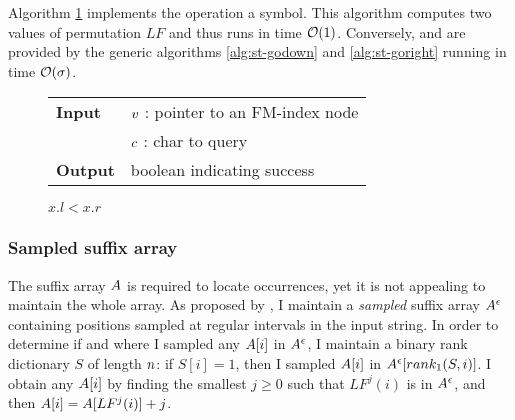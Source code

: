 Algorithm \ref{alg:fm-godownc} implements the operation  a symbol.
This algorithm computes two values of permutation $LF$ and thus runs in time $\mathcal{O}(1)$.
Conversely,  and  are provided by the generic algorithms \ref{alg:st-godown} and \ref{alg:st-goright} running in time $\mathcal{O}(\sigma)$.


\begin{figure*}
\begin{center}
\begin{minipage}[t]{.5\textwidth}
\begin{algorithm}[H]
\begin{tabular}{ll}
\textbf{Input}  & $v$ : pointer to an FM-index node\\
				& $c$ : char to query\\
\textbf{Output} & boolean indicating success\\
\end{tabular}
\begin{algorithmic}[1]
	\State \Return \False
\EndIf
{}
\State \Return $x.l < x.r$
\end{algorithmic}
\label{alg:fm-godownc}
\end{algorithm}
\end{minipage}
\end{center}
\end{figure*}

\subsubsection{Sampled suffix array}

The suffix array $A$ is required to locate occurrences, yet it is not appealing to maintain the whole array.
As proposed by \cite{Ferragina2000}, I maintain a \emph{sampled} suffix array $A^{\epsilon}$ containing positions sampled at regular intervals in the input string.
In order to determine if and where I sampled any $A[i]$ in $A^{\epsilon}$, I maintain a binary rank dictionary $S$ of length $n$: if $S[i]=1$, then I sampled $A[i]$ in $A^{\epsilon}[rank_1(S,i)]$.
I obtain any $A[i]$ by finding the smallest $j \geq 0$ such that $LF^j(i)$ is in $A^{\epsilon}$, and then $A[i] = A[LF^j(i)] + j$.


